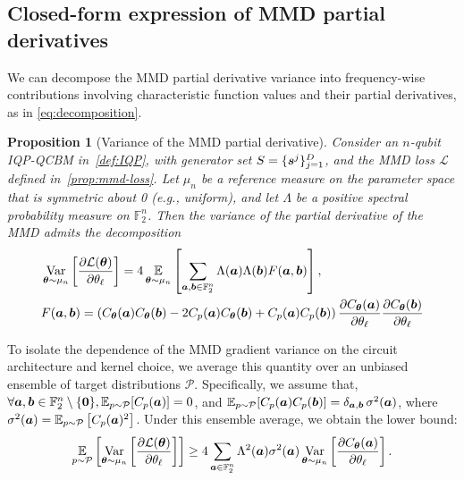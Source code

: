 \documentclass{article}
\theoremstyle{plain}
\newtheorem{proposition}[theorem]{Proposition}
\theoremstyle{definition}
\theoremstyle{remark}
\begin{document}
\subsection{Closed-form expression of MMD partial derivatives}
\label{subsec:mmd}
We can decompose the MMD partial derivative variance into frequency-wise contributions involving characteristic function values and their partial derivatives, as in \cref{eq:decomposition}.
\begin{proposition}[Variance of the MMD partial derivative]
\label{prop:lower}
Consider an $n$-qubit IQP-QCBM in~\cref{def:IQP}, with generator set $S=\{{\bm{s}^j}\}_{j=1}^D$, and the MMD loss $\mathcal{L}$ defined in~\cref{prop:mmd-loss}. Let $\mu_n$ be a reference measure on the parameter space that is symmetric about 0 (e.g., uniform), and let $\Lambda$ be a positive spectral probability measure on $\mathbb{F}_2^n$. Then the variance of the partial derivative of the MMD admits the decomposition
\begin{align}
&\operatorname*{Var}_{{\bm{\theta}}\sim \mu_n} \left[ \frac{\partial \mathcal{L}({\bm{\theta}})}{\partial \theta_\ell} \right]
= 4 \operatorname*{\mathbb{E}}_{{\bm{\theta}}\sim \mu_n} \left[ \sum_{{\bm{a}}, {\bm{b}} \in \mathbb{F}_2^n} \Lambda({\bm{a}}) \Lambda({\bm{b}})F({\bm{a}}, {\bm{b}})\right], \label{eq:decomposition} \\
&F({\bm{a}}, {\bm{b}}) = \left( C_{\bm{\theta}}({\bm{a}}) C_{\bm{\theta}}({\bm{b}}) - 2C_p({\bm{a}}) C_{\bm{\theta}}({\bm{b}}) + C_p({\bm{a}}) C_p({\bm{b}}) \right)\frac{\partial C_{\bm{\theta}}({\bm{a}})}{\partial \theta_\ell} \frac{\partial C_{\bm{\theta}}({\bm{b}})}{\partial \theta_\ell} \nonumber
\end{align}
\end{proposition}
To isolate the dependence of the MMD gradient variance on the circuit architecture and kernel choice, we average this quantity over an unbiased ensemble of target distributions $\mathcal P$. Specifically, we assume that, $\forall{\bm{a}}, {\bm{b}} \in \mathbb{F}_2^n \setminus \{\bm{0}\},\operatorname*{\mathbb {E}}_{p\sim\mathcal {P}}[C_p({\bm{a}})]=0$, and $\operatorname*{\mathbb {E}}_{p\sim\mathcal {P}}\!\left[C_p({\bm{a}})C_p({\bm{b}})\right]=\delta_{{\bm{a}},{\bm{b}}}\,\sigma^2({\bm{a}})$, where $\sigma^2({\bm{a}}) = \operatorname*{\mathbb {E}}_{p \sim \mathcal{P}}\left[C_p({\bm{a}})^2\right]$. Under this ensemble average, we obtain the lower bound:
\begin{equation}
\operatorname*{\mathbb{E}}_{p\sim\mathcal{P}} \left[\operatorname*{Var}_{{\bm{\theta}}\sim\mu_n}  
\left[\frac{\partial \mathcal{L}({\bm{\theta}})}{\partial \theta_\ell} \right]\right] \geq
4 \sum_{{\bm{a}}\in \mathbb{F}_2^n} \Lambda^2({\bm{a}})\sigma^2({\bm{a}})\operatorname*{Var}_{{\bm{\theta}}\sim\mu_n} \left[ \frac{\partial C_{\bm{\theta}}({\bm{a}})}{\partial \theta_\ell} \right].
\label{eq:lower-bound}
\end{equation}
\end{document}
